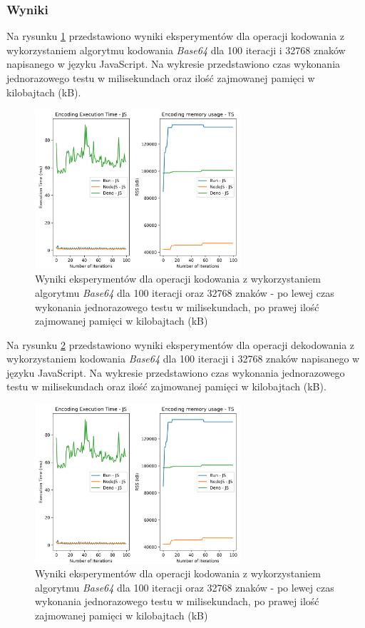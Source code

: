 \subsubsection{Wyniki}
Na rysunku \ref{fig:encoding_e1_js} przedstawiono wyniki eksperymentów dla operacji kodowania z wykorzystaniem algorytmu kodowania \textit{Base64} dla 100 iteracji i 32768 znaków napisanego w języku JavaScript. Na wykresie przedstawiono czas wykonania jednorazowego testu w milisekundach oraz ilość zajmowanej pamięci w kilobajtach (kB).

\begin{figure}[H]
  \centering
  \includegraphics[width=0.68\textwidth]{Figures/coding/base64_100_encoding_js.png}
  \caption{Wyniki eksperymentów dla operacji kodowania z wykorzystaniem algorytmu \textit{Base64} dla 100 iteracji oraz 32768 znaków - po lewej czas wykonania jednorazowego testu w milisekundach, po prawej ilość zajmowanej pamięci w kilobajtach (kB)}
  \label{fig:encoding_e1_js}
\end{figure}

Na rysunku \ref{fig:decoding_e1_js} przedstawiono wyniki eksperymentów dla operacji dekodowania z wykorzystaniem kodowania \textit{Base64} dla 100 iteracji i 32768 znaków napisanego w języku JavaScript. Na wykresie przedstawiono czas wykonania jednorazowego testu w milisekundach oraz ilość zajmowanej pamięci w kilobajtach (kB).

\begin{figure}[H]
  \centering
  \includegraphics[width=0.68\textwidth]{Figures/coding/base64_100_encoding_js.png}
  \caption{Wyniki eksperymentów dla operacji kodowania z wykorzystaniem algorytmu \textit{Base64} dla 100 iteracji oraz 32768 znaków - po lewej czas wykonania jednorazowego testu w milisekundach, po prawej ilość zajmowanej pamięci w kilobajtach (kB)}
  \label{fig:decoding_e1_js}
\end{figure}

